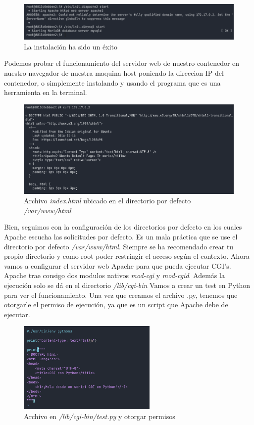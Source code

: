 \begin{figure}[H]
  \centering
  \includegraphics[width=1.0\textwidth]{img/start_daemons.png}
  \caption{La instalación ha sido un éxito}
\end{figure}

Podemos probar el funcionamiento del servidor web de nuestro contenedor en nuestro navegador de nuestra 
maquina host poniendo la direccion IP del contenedor, o simplemente instalando y usando el programa 
 que es una herramienta en la terminal.

\begin{figure}[H]
  \centering
  \includegraphics[width=1.0\textwidth]{img/server.png}
  \caption{Archivo \textit{index.html} ubicado en el directorio por defecto \textit{/var/www/html}}
\end{figure}

Bien, seguimos con la configuración de los directorios por defecto en los cuales Apache escucha las 
solicitudes por defecto. Es un mala práctica que se use el directorio por defecto \textit{/var/www/html}. 
Siempre se ha recomendado crear tu propio directorio y como root poder restringir el acceso según 
el contexto.
\singlespacing
Ahora vamos a configurar el servidor web Apache para que pueda ejecutar CGI's. Apache trae consigo dos 
modulos nativos \textit{mod-cgi} y \textit{mod-cgid}. Además la ejecución solo se dá en el directorio 
\textit{/lib/cgi-bin}
\singlespacing
Vamos a crear un test en Python para ver el funcionamiento. Una vez que creamos el archivo .py, tenemos 
que otorgarle el permiso de ejecución, ya que es un script que Apache debe de ejecutar.

\begin{figure}[H]
  \centering
  \includegraphics[width=0.6\textwidth]{img/create_cgi.png}
  \caption{Archivo en \textit{/lib/cgi-bin/test.py} y otorgar permisos}
\end{figure}

